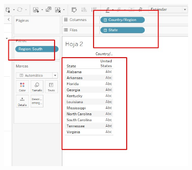 \documentclass[preprint,12pt]{elsarticle}
\begin{document}
\begin{itemize}
		\\	\includegraphics[width=10cm]{./IMAGENES/5.2}
	\end{itemize}
		
\end{document}
